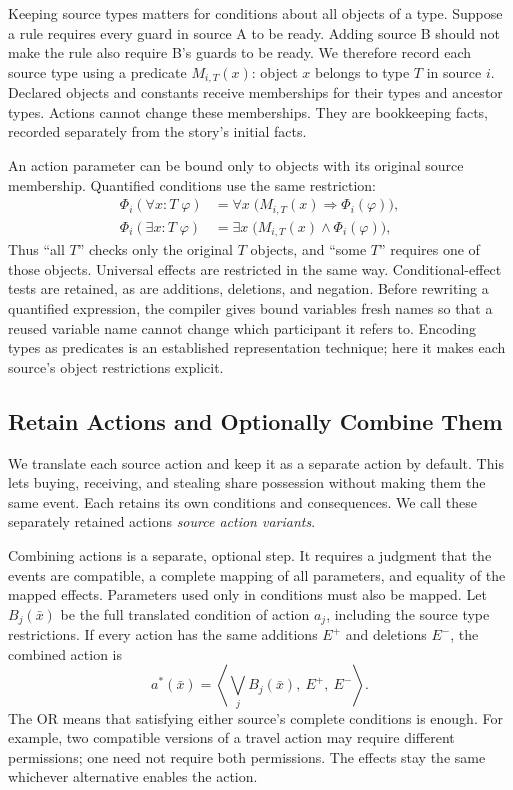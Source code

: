 \documentclass[letterpaper]{article}
\newcommand{\enc}{\Phi}
\begin{document}
Keeping source types matters for conditions about all objects of a type. Suppose a rule requires every guard in source A to be ready. Adding source B should not make the rule also require B's guards to be ready. We therefore record each source type using a predicate $M_{i,T}(x)$: object $x$ belongs to type $T$ in source $i$. Declared objects and constants receive memberships for their types and ancestor types. Actions cannot change these memberships. They are bookkeeping facts, recorded separately from the story's initial facts.

An action parameter can be bound only to objects with its original source membership. Quantified conditions use the same restriction:
\begin{equation}
\begin{aligned}
\enc_i(\forall x{:}T\;\varphi)
&=\forall x\;\bigl(M_{i,T}(x)\Rightarrow\enc_i(\varphi)\bigr),\\
\enc_i(\exists x{:}T\;\varphi)
&=\exists x\;\bigl(M_{i,T}(x)\land\enc_i(\varphi)\bigr),
\end{aligned}
\end{equation}
Thus ``all $T$'' checks only the original $T$ objects, and ``some $T$'' requires one of those objects. Universal effects are restricted in the same way. Conditional-effect tests are retained, as are additions, deletions, and negation. Before rewriting a quantified expression, the compiler gives bound variables fresh names so that a reused variable name cannot change which participant it refers to. Encoding types as predicates is an established representation technique; here it makes each source's object restrictions explicit.

\subsection{Retain Actions and Optionally Combine Them}
We translate each source action and keep it as a separate action by default. This lets buying, receiving, and stealing share possession without making them the same event. Each retains its own conditions and consequences. We call these separately retained actions \emph{source action variants}.

Combining actions is a separate, optional step. It requires a judgment that the events are compatible, a complete mapping of all parameters, and equality of the mapped effects. Parameters used only in conditions must also be mapped. Let $B_j(\bar x)$ be the full translated condition of action $a_j$, including the source type restrictions. If every action has the same additions $E^+$ and deletions $E^-$, the combined action is
\begin{equation}
a^*(\bar x)=\left\langle\bigvee_j B_j(\bar x),\ E^+,\ E^-\right\rangle.
\end{equation}
The OR means that satisfying either source's complete conditions is enough. For example, two compatible versions of a travel action may require different permissions; one need not require both permissions. The effects stay the same whichever alternative enables the action.
\end{document}
